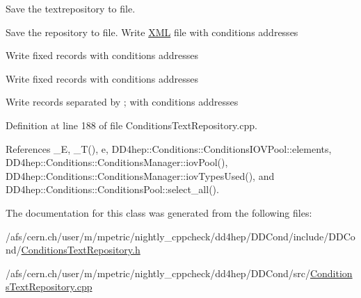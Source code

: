Save the textrepository to file. 

Save the repository to file. Write \hyperlink{namespace_d_d4hep_1_1_x_m_l}{X\+ML} file with conditions addresses

Write fixed records with conditions addresses

Write fixed records with conditions addresses

Write records separated by \textquotesingle{};\textquotesingle{} with conditions addresses 

Definition at line 188 of file Conditions\+Text\+Repository.\+cpp.



References \+\_\+E, \+\_\+\+T(), e, D\+D4hep\+::\+Conditions\+::\+Conditions\+I\+O\+V\+Pool\+::elements, D\+D4hep\+::\+Conditions\+::\+Conditions\+Manager\+::iov\+Pool(), D\+D4hep\+::\+Conditions\+::\+Conditions\+Manager\+::iov\+Types\+Used(), and D\+D4hep\+::\+Conditions\+::\+Conditions\+Pool\+::select\+\_\+all().



The documentation for this class was generated from the following files\+:\begin{DoxyCompactItemize}
\item 
/afs/cern.\+ch/user/m/mpetric/nightly\+\_\+cppcheck/dd4hep/\+D\+D\+Cond/include/\+D\+D\+Cond/\hyperlink{_conditions_text_repository_8h}{Conditions\+Text\+Repository.\+h}\item 
/afs/cern.\+ch/user/m/mpetric/nightly\+\_\+cppcheck/dd4hep/\+D\+D\+Cond/src/\hyperlink{_conditions_text_repository_8cpp}{Conditions\+Text\+Repository.\+cpp}\end{DoxyCompactItemize}
